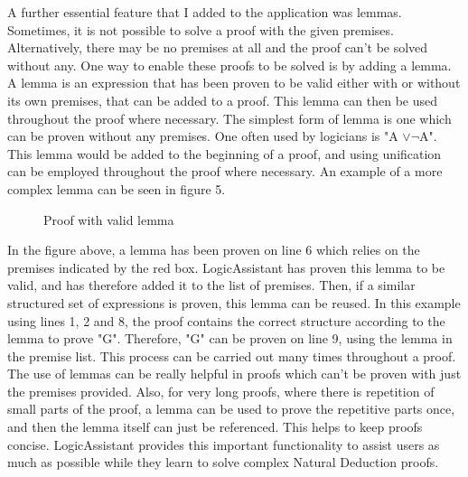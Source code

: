 A further essential feature that I added to the application was lemmas. Sometimes, it is not possible to solve a proof with the given premises. Alternatively, there may be no premises at all and the proof can't be solved without any. One way to enable these proofs to be solved is by adding a lemma. A lemma is an expression that has been proven to be valid either with or without its own premises, that can be added to a proof. This lemma can then be used throughout the proof where necessary. The simplest form of lemma is one which can be proven without any premises. One often used by logicians is "A $\vee \neg$A". This lemma would be added to the beginning of a proof, and using unification can be employed throughout the proof where necessary. An example of a more complex lemma can be seen in figure 5.

\begin{figure}[!ht]
	\centering
	\caption{Proof with valid lemma}
\end{figure}

In the figure above, a lemma has been proven on line 6 which relies on the premises indicated by the red box. LogicAssistant has proven this lemma to be valid, and has therefore added it to the list of premises. Then, if a similar structured set of expressions is proven, this lemma can be reused. In this example using lines 1, 2 and 8, the proof contains the correct structure according to the lemma to prove "G". Therefore, "G" can be proven on line 9, using the lemma in the premise list. This process can be carried out many times throughout a proof. The use of lemmas can be really helpful in proofs which can't be proven with just the premises provided. Also, for very long proofs, where there is repetition of small parts of the proof, a lemma can be used to prove the repetitive parts once, and then the lemma itself can just be referenced. This helps to keep proofs concise. LogicAssistant provides this important functionality to assist users as much as possible while they learn to solve complex Natural Deduction proofs. 


